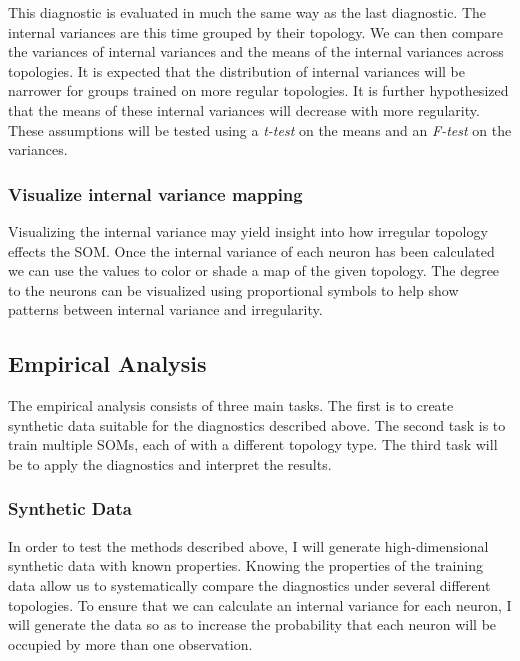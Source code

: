 \documentclass[10pt,titlepage]{article}
\begin{document}
This diagnostic is evaluated in much the same way as the last diagnostic.  
The internal variances are this time grouped by their topology.  We can then
compare the variances of internal variances and the means of the internal
variances across topologies.  It is expected that the distribution of internal
variances will be narrower for groups trained on more regular topologies.
It is further hypothesized that the means of these internal variances will
decrease with more regularity.  These assumptions will be tested using
a \emph{t-test} on the means and an \emph{F-test} on the variances.

\subsubsection{Visualize internal variance mapping}
Visualizing the internal variance may yield insight into how irregular topology
effects the SOM.  Once the internal variance of each neuron has been calculated
we can use the values to color or shade a map of the given topology.  The degree
to the neurons can be visualized using proportional symbols to help show
patterns between internal variance and irregularity.

\subsection{Empirical Analysis}
The empirical analysis consists of three main tasks.  The first is to create
synthetic data suitable for the diagnostics described above.  The second task is
to train multiple SOMs, each of with a different topology type. The third task
will be to apply the diagnostics and interpret the results.

\subsubsection{Synthetic Data}
In order to test the methods described above, I will generate high-dimensional
synthetic data with known properties.  Knowing the properties of the training
data allow us to systematically compare the diagnostics under several different
topologies.  To ensure that we can calculate an internal variance for each
neuron, I will generate the data so as to increase the probability that each
neuron will be occupied by more than one observation.
\end{document}
